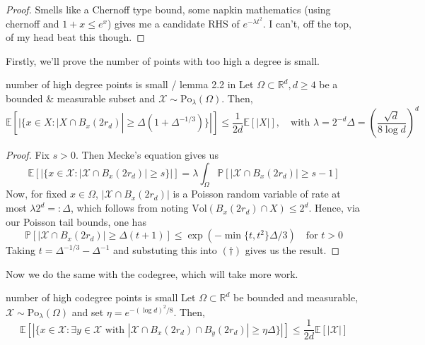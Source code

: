 \documentclass{article}
\begin{document}
\begin{proof}
    Smells like a Chernoff type bound, some napkin mathematics (using chernoff and $1+x \leq e^x$) gives me a candidate 
    RHS of $e^{-\lambda t^2}$. I can't, off the top, of my head beat this though.
\end{proof}

Firstly, we'll prove the number of points with too high a degree is small.

\begin{lemma}[]{number of high degree points is small / lemma 2.2 in \cite{campos2023}}
    Let $\Omega \subset \mathbb{R}^d, d \geq 4$ be a bounded $\&$ measurable subset and 
    $\mathcal{X} \sim \text{Po}_{\lambda}(\Omega)$. Then, 
    \[\mathbb{E}[|\{x \in X : |X \cap B_x(2r_d)| \geq \Delta(1+\Delta^{-1/3})\}|] \leq \frac{1}{2d}\mathbb{E}[|X|], 
    \quad \text{with } \lambda = 2^{-d}\Delta = \left(\frac{\sqrt{d}}{8 \log d}\right)^d\] 
\end{lemma}

\begin{proof}
    Fix $s > 0$. Then Mecke's equation gives us 
    \[\mathbb{E}[|\{x \in \mathcal{X} : |\mathcal{X} \cap B_x(2r_d)| \geq s\}|] 
    = \lambda \int_{\Omega} \mathbb{P}[|\mathcal{X} \cap B_x(2r_d)| \geq s-1] \tag{$\dagger$}\]
    Now, for fixed $x \in \Omega$, $|\mathcal{X} \cap B_x(2r_d)|$ is a Poisson random variable of rate at most 
    $\lambda 2^d =: \Delta$, which follows from noting $\text{Vol}(B_x(2r_d) \cap X) \leq 2^d$. Hence, via our 
    Poisson tail bounds, one has 
    \[\mathbb{P}[|\mathcal{X} \cap B_x(2r_d)| \geq \Delta(t+1)] 
    \leq \exp\left(-\min\{t, t^2\}\Delta/3\right) \quad \text{for } t > 0\] 
    Taking $t = \Delta^{-1/3} - \Delta^{-1}$ and substuting this into $(\dagger)$ gives us the result.
\end{proof}

Now we do the same with the codegree, which will take more work. 

\begin{lemma}[]{number of high codegree points is small}
    Let $\Omega \subset \mathbb{R}^d$ be bounded and measurable, $\mathcal{X} \sim \text{Po}_\lambda(\Omega)$ and set 
    $\eta = e^{-(\log d)^2/8}$. Then, \[\mathbb{E}\left[\left|\{x \in \mathcal{X} : \exists y \in \mathcal{X} \text{ with }
    |\mathcal{X} \cap B_x(2r_d) \cap B_y(2r_d)| \geq \eta \Delta\}\right|\right] \leq \frac{1}{2d}\mathbb{E}[|\mathcal{X}|]\]
\end{lemma}
\end{document}
